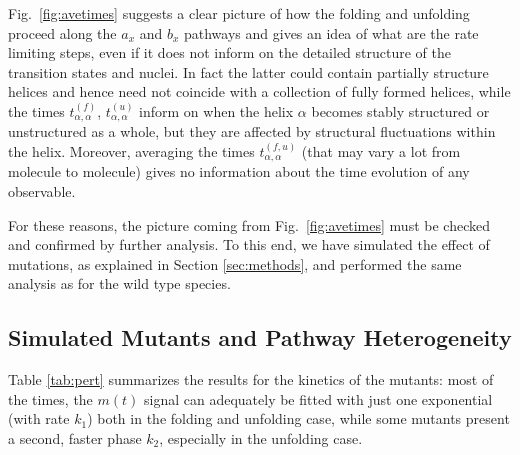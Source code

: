 Fig.~\ref{fig:avetimes} suggests a clear picture of how the folding and
unfolding proceed along the $a_x$ and $b_x$ pathways
and gives an idea of what are the rate limiting steps, even if it does not
inform on the detailed structure of the transition states and nuclei. 
In fact the latter could contain partially structure helices and hence need not
coincide with a collection of fully formed helices, while the times
$t_{\alpha,\alpha}^{(f)}$, $t_{\alpha,\alpha}^{(u)}$  inform on when the helix
$\alpha$ becomes stably structured or unstructured as a whole, but they are affected
by structural fluctuations within the helix.
Moreover, averaging the times $t_{\alpha,\alpha}^{(f,u)}$ (that may vary a lot
from molecule to molecule) gives no information about the time evolution of any
observable.


For these reasons, the picture coming from Fig.~\ref{fig:avetimes} must be
checked and confirmed by further analysis. To this end,
 we have simulated the effect of  mutations, as explained in Section
\ref{sec:methods}, and performed the same analysis as for the wild type species.

\subsection{Simulated Mutants and Pathway Heterogeneity}


Table \ref{tab:pert} summarizes the results for the kinetics of the mutants:
most of the times, the $m(t)$ signal can adequately be fitted with just one
exponential (with rate $k_1$) both in the folding and unfolding case, while some
mutants present a second, faster  phase $k_2$, especially in the unfolding case.

